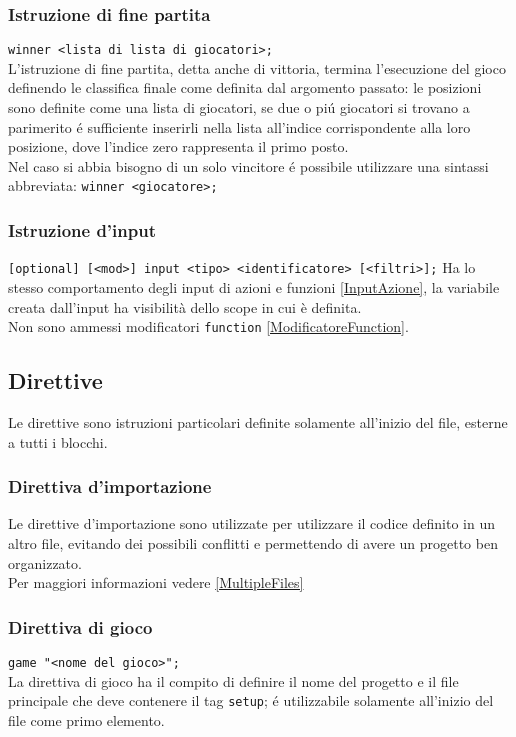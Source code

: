 \subsubsection{Istruzione di fine partita}
\lstinline|winner <lista di lista di giocatori>;| \\
L'istruzione di fine partita, detta anche di vittoria, termina l'esecuzione del gioco definendo 
le classifica finale come definita dal argomento passato: le posizioni sono definite come una lista di giocatori,
se due o piú giocatori si trovano a parimerito é sufficiente inserirli nella lista all'indice corrispondente 
alla loro posizione, dove l'indice zero rappresenta il primo posto. \\
Nel caso si abbia bisogno di un solo vincitore é possibile utilizzare una sintassi abbreviata: 
\lstinline|winner <giocatore>;| 

\subsubsection{Istruzione d'input}
\lstinline|[optional] [<mod>] input <tipo> <identificatore> [<filtri>];|
Ha lo stesso comportamento degli input di azioni e funzioni \ref{InputAzione}, la variabile
creata dall'input ha visibilità dello scope in cui è definita. \\
Non sono ammessi modificatori \lstinline|function| \ref{ModificatoreFunction}.

\subsection{Direttive}
Le direttive sono istruzioni particolari definite solamente all'inizio del file, esterne a 
tutti i blocchi.

\subsubsection{Direttiva d'importazione}
Le direttive d'importazione sono utilizzate per utilizzare il codice definito in un altro
file, evitando dei possibili conflitti e permettendo di avere un progetto ben organizzato. \\
Per maggiori informazioni vedere \ref{MultipleFiles}

\subsubsection{Direttiva di gioco}
\lstinline|game "<nome del gioco>";| \\
La direttiva di gioco ha il compito di definire il nome del progetto e il file principale
che deve contenere il tag \lstinline|setup|; é utilizzabile solamente all'inizio del file 
come primo elemento. \\

